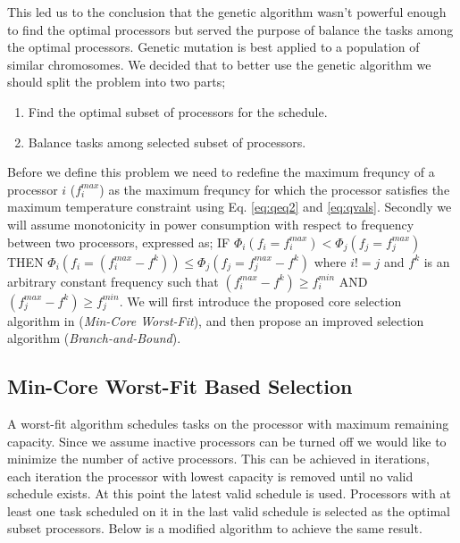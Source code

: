 \documentclass[conference]{IEEEtran}
\begin{document}
This led us to the conclusion that the genetic algorithm wasn't powerful enough to find the optimal processors but served the purpose of balance the tasks among the optimal processors. Genetic mutation is best applied to a population of similar chromosomes. We decided that to better use the genetic algorithm we should split the problem into two parts;
\begin{enumerate}
	\item Find the optimal subset of processors for the schedule.
	\item Balance tasks among selected subset of processors.
\end{enumerate}

Before we define this problem we need to redefine the maximum frequncy of a processor $i$ ($f^{max}_{i}$) as the maximum frequncy for which the processor satisfies the maximum temperature constraint using Eq. \ref{eq:qeq2} and \ref{eq:qvals}. Secondly we will assume monotonicity in power consumption with respect to frequency between two processors, expressed as; IF $\Phi_{i}(f_{i}=f^{max}_{i}) < \Phi_{j}(f_{j}=f^{max}_{j})$ THEN $\Phi_{i}(f_{i}=(f^{max}_{i} - f^{k})) \le \Phi_{j}(f_{j}=f^{max}_{j} - f^{k})$ where $i != j$ and $f^{k}$ is an arbitrary constant frequency such that $(f^{max}_{i} - f^{k}) \ge f^{min}_{i}$ AND $(f^{max}_{j} - f^{k}) \ge f^{min}_{j}$.
We will first introduce the proposed core selection algorithm in \cite{Saha12} (\emph{Min-Core Worst-Fit}), and then propose an improved selection algorithm (\emph{Branch-and-Bound}).

\subsection{Min-Core Worst-Fit Based Selection}

A worst-fit algorithm schedules tasks on the processor with maximum remaining capacity. Since we assume inactive processors can be turned off we would like to minimize the number of active processors. This can be achieved in iterations, each iteration the processor with lowest capacity is removed until no valid schedule exists. At this point the latest valid schedule is used. Processors with at least one task scheduled on it in the last valid schedule is selected as the optimal subset processors. Below is a modified algorithm to achieve the same result.
\end{document}
